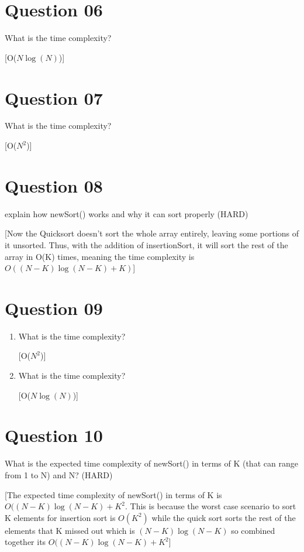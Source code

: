 \documentclass{article}
\begin{document}
\section{Question 06}

\item What is the time complexity?

[O($N\log(N)$)]

\section{Question 07}

\item What is the time complexity?

[O($N^2$)]

\section{Question 08}

\item explain how newSort() works and why it can sort properly (HARD)

[Now the Quicksort doesn't sort the whole array entirely, leaving some portions of it unsorted. Thus, with the addition
of insertionSort, it will sort the rest of the array in O(K) times, meaning the time complexity is
$O((N - K)\log(N- K) + K)$]

\section{Question 09}
\begin{enumerate}
\item What is the time complexity?

[O($N^2$)]

\item What is the time complexity?

[O($N \log(N)$)]
\end{enumerate}

\section{Question 10}

\item What is the expected time complexity of newSort() in terms of K (that can range from 1 to N) and N? (HARD)

[The expected time complexity of newSort() in terms of K is $O((N-K)\log(N-K) + K^2$. This is because the worst
case scenario to sort K elements for insertion sort is $O(K^2)$ while the quick sort sorts the rest of the elements that K missed out which is $(N-K)\log(N-K)$ so combined together its $O((N-K)\log(N-K) + K^2$]
\end{document}
